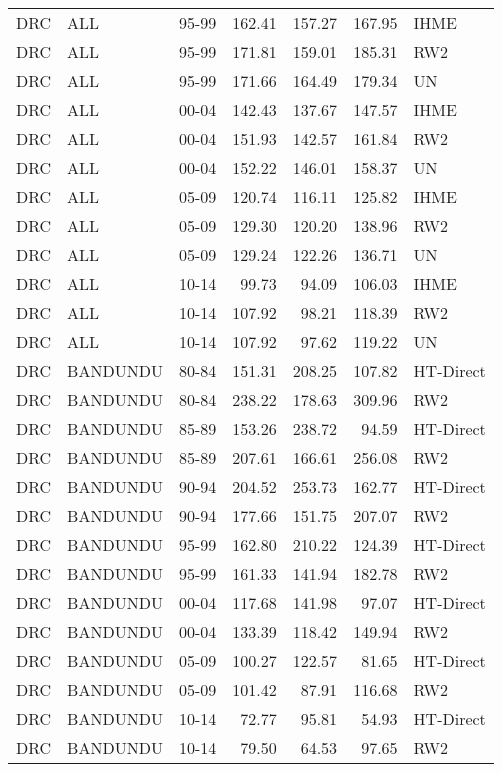 \begin{longtable}{lllrrrl}
  DRC & ALL & 95-99 & 162.41 & 157.27 & 167.95 & IHME \\ 
  DRC & ALL & 95-99 & 171.81 & 159.01 & 185.31 & RW2 \\ 
  DRC & ALL & 95-99 & 171.66 & 164.49 & 179.34 & UN \\ 
  DRC & ALL & 00-04 & 142.43 & 137.67 & 147.57 & IHME \\ 
  DRC & ALL & 00-04 & 151.93 & 142.57 & 161.84 & RW2 \\ 
  DRC & ALL & 00-04 & 152.22 & 146.01 & 158.37 & UN \\ 
  DRC & ALL & 05-09 & 120.74 & 116.11 & 125.82 & IHME \\ 
  DRC & ALL & 05-09 & 129.30 & 120.20 & 138.96 & RW2 \\ 
  DRC & ALL & 05-09 & 129.24 & 122.26 & 136.71 & UN \\ 
  DRC & ALL & 10-14 & 99.73 & 94.09 & 106.03 & IHME \\ 
  DRC & ALL & 10-14 & 107.92 & 98.21 & 118.39 & RW2 \\ 
  DRC & ALL & 10-14 & 107.92 & 97.62 & 119.22 & UN \\ 
  DRC & BANDUNDU & 80-84 & 151.31 & 208.25 & 107.82 & HT-Direct \\ 
  DRC & BANDUNDU & 80-84 & 238.22 & 178.63 & 309.96 & RW2 \\ 
  DRC & BANDUNDU & 85-89 & 153.26 & 238.72 & 94.59 & HT-Direct \\ 
  DRC & BANDUNDU & 85-89 & 207.61 & 166.61 & 256.08 & RW2 \\ 
  DRC & BANDUNDU & 90-94 & 204.52 & 253.73 & 162.77 & HT-Direct \\ 
  DRC & BANDUNDU & 90-94 & 177.66 & 151.75 & 207.07 & RW2 \\ 
  DRC & BANDUNDU & 95-99 & 162.80 & 210.22 & 124.39 & HT-Direct \\ 
  DRC & BANDUNDU & 95-99 & 161.33 & 141.94 & 182.78 & RW2 \\ 
  DRC & BANDUNDU & 00-04 & 117.68 & 141.98 & 97.07 & HT-Direct \\ 
  DRC & BANDUNDU & 00-04 & 133.39 & 118.42 & 149.94 & RW2 \\ 
  DRC & BANDUNDU & 05-09 & 100.27 & 122.57 & 81.65 & HT-Direct \\ 
  DRC & BANDUNDU & 05-09 & 101.42 & 87.91 & 116.68 & RW2 \\ 
  DRC & BANDUNDU & 10-14 & 72.77 & 95.81 & 54.93 & HT-Direct \\ 
  DRC & BANDUNDU & 10-14 & 79.50 & 64.53 & 97.65 & RW2 \\ 

\end{longtable}
